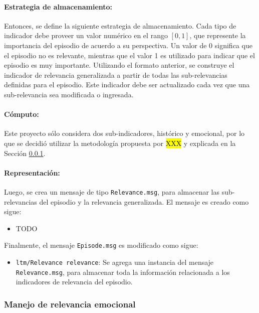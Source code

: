 \paragraph{Estrategia de almacenamiento:}
Entonces, se define la siguiente estrategia de almacenamiento. Cada tipo de indicador debe proveer un valor numérico en el rango $[0, 1]$, que represente la importancia del episodio de acuerdo a su perspectiva. Un valor de 0 significa que el episodio no es relevante, mientras que el valor 1 es utilizado para indicar que el episodio es muy importante. Utilizando el formato anterior, se construye el indicador de relevancia generalizada a partir de todas las sub-relevancias definidas para el episodio. Este indicador debe ser actualizado cada vez que una sub-relevancia sea modificada o ingresada.


\paragraph{Cómputo:}
Este proyecto sólo considera dos sub-indicadores, histórico y emocional, por lo que se decidió utilizar la metodología propuesta por \hl{XXX} \cite{} y explicada en la Sección \ref{}.


\paragraph{Representación:}
Luego, se crea un mensaje de tipo \texttt{Relevance.msg}, para almacenar las sub-relevancias del episodio y la relevancia generalizada. El mensaje es creado como sigue:
\begin{itemize}
\item TODO
\end{itemize}

Finalmente, el mensaje \texttt{Episode.msg} es modificado como sigue:
\begin{itemize}
	\item \texttt{ltm/Relevance relevance}: Se agrega una instancia del mensaje \texttt{Relevance.msg}, para almacenar toda la información relacionada a los indicadores de relevancia del episodio.
\end{itemize}


\subsubsection{Manejo de relevancia emocional}

